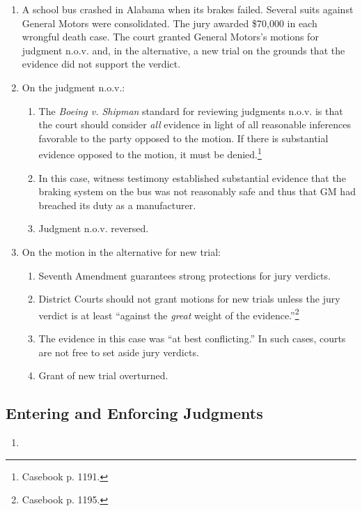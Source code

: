 \begin{enumerate}
    \item A school bus crashed in Alabama when its brakes failed. Several 
    suits against General Motors were consolidated. The jury awarded \$70,000 
    in each wrongful death case. The court granted General Motors's motions 
    for judgment n.o.v. and, in the alternative, a new trial on the grounds 
    that the evidence did not support the verdict.  \item On the judgment 
    n.o.v.:
    \begin{enumerate}
        \item The \emph{Boeing v. Shipman} standard for reviewing judgments 
        n.o.v. is that the court should consider \emph{all} evidence in light 
        of all reasonable inferences favorable to the party opposed to the 
        motion. If there is substantial evidence opposed to the motion, it 
        must be denied.\footnote{Casebook p. 1191.}
        \item In this case, witness testimony established substantial evidence 
        that the braking system on the bus was not reasonably safe and thus 
        that GM had breached its duty as a manufacturer.
        \item Judgment n.o.v. reversed.
    \end{enumerate}
    \item On the motion in the alternative for new trial:
    \begin{enumerate}
        \item Seventh Amendment guarantees strong protections for jury 
        verdicts.
        \item District Courts should not grant motions for new trials unless 
        the jury verdict is at least ``against the \emph{great} weight of the 
        evidence.''\footnote{Casebook p. 1195.}
        \item The evidence in this case was ``at best conflicting.'' In such 
        cases, courts are not free to set aside jury verdicts.
        \item Grant of new trial overturned.
    \end{enumerate}
\end{enumerate}

\subsection{Entering and Enforcing Judgments}

\begin{enumerate}
    \item \end{enumerate}


